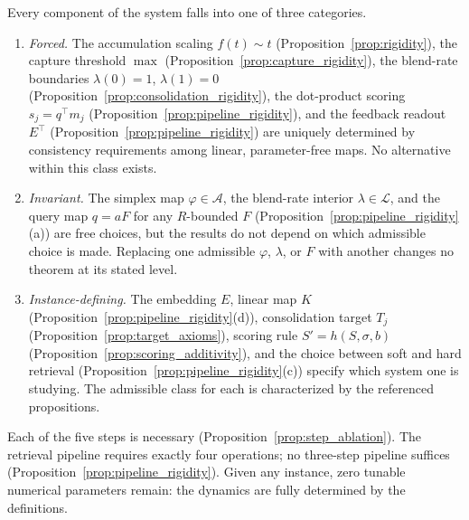 \begin{remark}
\label{rem:rigidity_summary}
\leanok
{}
Every component of the system falls into one of three categories.
\begin{enumerate}
\item \emph{Forced.}  The accumulation scaling $f(t) \sim t$ (Proposition~\ref{prop:rigidity}), the capture threshold $\max$ (Proposition~\ref{prop:capture_rigidity}), the blend-rate boundaries $\lambda(0) = 1$, $\lambda(1) = 0$ (Proposition~\ref{prop:consolidation_rigidity}), the dot-product scoring $s_j = q^\top m_j$ (Proposition~\ref{prop:pipeline_rigidity}), and the feedback readout $E^\top$ (Proposition~\ref{prop:pipeline_rigidity}) are uniquely determined by consistency requirements among linear, parameter-free maps.  No alternative within this class exists.
\item \emph{Invariant.}  The simplex map $\varphi \in \mathcal{A}$, the blend-rate interior $\lambda \in \mathcal{L}$, and the query map $q = aF$ for any $R$-bounded $F$ (Proposition~\ref{prop:pipeline_rigidity}(a)) are free choices, but the results do not depend on which admissible choice is made.  Replacing one admissible $\varphi$, $\lambda$, or $F$ with another changes no theorem at its stated level.
\item \emph{Instance-defining.}  The embedding $E$, linear map $K$ (Proposition~\ref{prop:pipeline_rigidity}(d)), consolidation target $T_j$ (Proposition~\ref{prop:target_axioms}), scoring rule $S' = h(S, \sigma, b)$ (Proposition~\ref{prop:scoring_additivity}), and the choice between soft and hard retrieval (Proposition~\ref{prop:pipeline_rigidity}(c)) specify which system one is studying.  The admissible class for each is characterized by the referenced propositions.
\end{enumerate}
Each of the five steps is necessary (Proposition~\ref{prop:step_ablation}).  The retrieval pipeline requires exactly four operations; no three-step pipeline suffices (Proposition~\ref{prop:pipeline_rigidity}).  Given any instance, zero tunable numerical parameters remain: the dynamics are fully determined by the definitions.
\end{remark}

